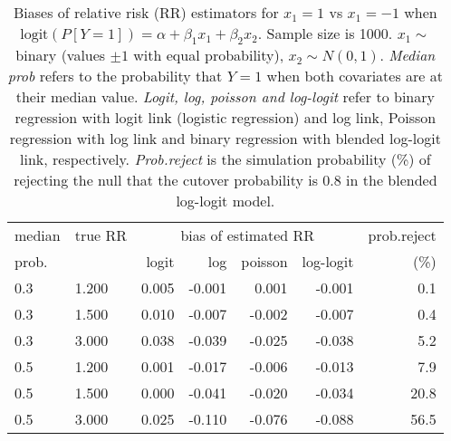 \documentclass[12pt,a4paper]{article}
\begin{document}
\begin{table}[H] 
\small\sf\centering 
\caption{Biases of relative risk (RR) estimators for $x_1=1$ vs $x_1=-1$ when $\mbox{logit}(P[Y=1])=\alpha+\beta_1 x_1 + \beta_2 x_2$. Sample size is 1000. $x_1 \sim $binary (values $\pm 1$ with equal probability), $x_2 \sim N(0,1)$. {\it Median prob} refers to the probability that $Y=1$ when both covariates are at their median value. {\it Logit, log, poisson and log-logit} refer to binary regression with logit link (logistic regression) and log link, Poisson regression with log link and binary regression with blended log-logit link, respectively. {\it Prob.reject} is the simulation probability (\%) of rejecting the null that the cutover probability is $0.8$ in the blended log-logit model.} 
\begin{tabular}{llrrrrr} 
\toprule 
median & true RR & \multicolumn{4}{c}{bias of estimated RR} & prob.reject \\ 
prob. & & logit & log & poisson & log-logit  & (\%) \\ \midrule 
0.3 & 1.200 & 0.005 & -0.001 &  0.001 & -0.001 &  0.1 \\  
0.3 & 1.500 & 0.010 & -0.007 & -0.002 & -0.007 &  0.4 \\  
0.3 & 3.000 & 0.038 & -0.039 & -0.025 & -0.038 &  5.2 \\  
0.5 & 1.200 & 0.001 & -0.017 & -0.006 & -0.013 &  7.9 \\  
0.5 & 1.500 & 0.000 & -0.041 & -0.020 & -0.034 & 20.8 \\  
0.5 & 3.000 & 0.025 & -0.110 & -0.076 & -0.088 & 56.5 \\  
\bottomrule 
\end{tabular} 
\end{table} 
\end{document}
